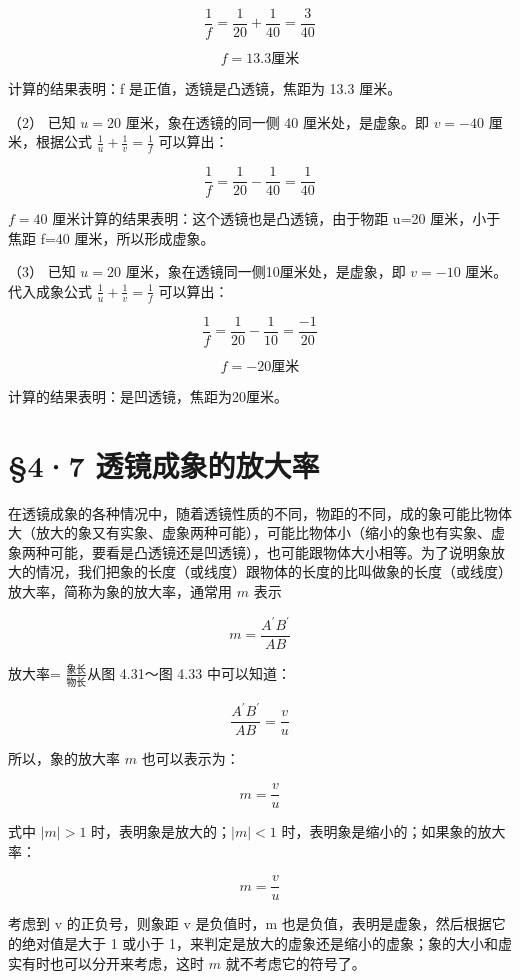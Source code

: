 \[
\frac {1}{f} = \frac {1}{20} + \frac {1}{40} = \frac {3}{40}
\]

\[
f = 13.3 \text{厘米}
\]

计算的结果表明：f 是正值，透镜是凸透镜，焦距为 13.3 厘米。

（2） 已知 \(u = 20\) 厘米，象在透镜的同一侧 40 厘米处，是虚象。即
\(v = -40\) 厘米，根据公式 \(\frac{1}{u} + \frac{1}{v} = \frac{1}{f}\)
可以算出：

\[
\frac {1}{f} = \frac {1}{20} - \frac {1}{40} = \frac {1}{40}
\]

\(f = 40\) 厘米计算的结果表明：这个透镜也是凸透镜，由于物距 u=20
厘米，小于焦距 f=40 厘米，所以形成虚象。

（3） 已知 \(u = 20\) 厘米，象在透镜同一侧10厘米处，是虚象，即
\(v = -10\) 厘米。代入成象公式
\(\frac{1}{u} + \frac{1}{v} = \frac{1}{f}\) 可以算出：

\[
\frac {1}{f} = \frac {1}{20} - \frac {1}{10} = \frac {- 1}{20}
\]

\[
f = - 20 \text{厘米}
\]

计算的结果表明：是凹透镜，焦距为20厘米。

\section{§4·7
透镜成象的放大率}

在透镜成象的各种情况中，随着透镜性质的不同，物距的不同，成的象可能比物体大（放大的象又有实象、虚象两种可能），可能比物体小（缩小的象也有实象、虚象两种可能，要看是凸透镜还是凹透镜），也可能跟物体大小相等。为了说明象放大的情况，我们把象的长度（或线度）跟物体的长度的比叫做象的长度（或线度）放大率，简称为象的放大率，通常用
\(m\) 表示

\[
m = \frac {A ^ {\prime} B ^ {\prime}}{A B}
\]

放大率= \(\frac{\text{象长}}{\text{物长}}\)从图 4.31～图 4.33
中可以知道：

\[
\frac {A ^ {\prime} B ^ {\prime}}{A B} = \frac {v}{u}
\]

所以，象的放大率 \(m\) 也可以表示为：

\[
m = \frac {v}{u}
\]

式中 \(|m| > 1\) 时，表明象是放大的；\(|m| < 1\)
时，表明象是缩小的；如果象的放大率：

\[
m = \frac {v}{u}
\]

考虑到 v 的正负号，则象距 v 是负值时，m
也是负值，表明是虚象，然后根据它的绝对值是大于 1 或小于
1，来判定是放大的虚象还是缩小的虚象；象的大小和虚实有时也可以分开来考虑，这时
\(m\) 就不考虑它的符号了。

